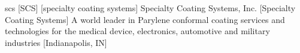 \newglsXcompany%
{scs}%
[SCS]%
[specialty coating systems]%
{Specialty Coating Systems\textsuperscript{\texttrademark}, Inc.}%
[Specialty Coating Systems]%
{A world leader in Parylene conformal coating services and technologies for the medical device, electronics, automotive and military industries \cite{website:Specialty_Coating_Systems}}%
[Indianapolis, IN]%